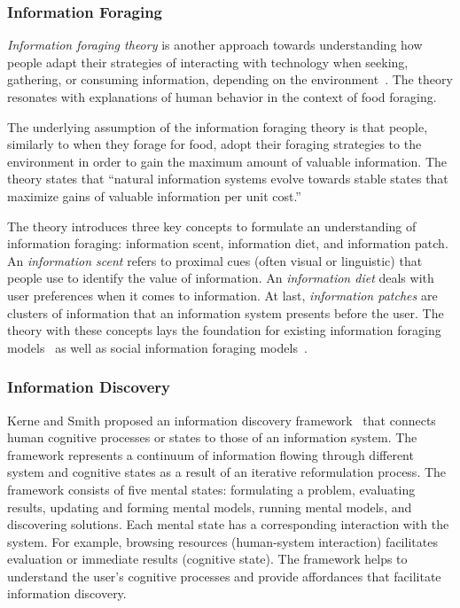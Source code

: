 \documentclass{sigchi}
\begin{document}
\subsubsection{Information Foraging}
\textit{Information foraging theory} is another approach towards understanding how people adapt their strategies of interacting with technology when seeking, gathering, or consuming information, depending on the environment~\cite{pirolli1999information}. The theory resonates with explanations of human behavior in the context of food foraging. 

The underlying assumption of the information foraging theory is that people, similarly to when they forage for food, adopt their foraging strategies to the environment in order to gain the maximum amount of valuable information. The theory states that ``natural information systems evolve towards stable states that maximize gains of valuable information per unit cost.''

The theory introduces three key concepts to formulate an understanding of information foraging: information scent, information diet, and information patch. An \textit{information scent} refers to proximal cues (often visual or linguistic) that people use to identify the value of information. An \textit{information diet} deals with user preferences when it comes to information. At last, \textit{information patches} are clusters of information that an information system presents before the user. The theory with these concepts lays the foundation for existing information foraging models~\cite{fu2007snif,kitajima2000comprehension} as well as social information foraging models~\cite{pirolli2009elementary,fu2008microstructures}.  


\subsubsection{Information Discovery}
Kerne and Smith proposed an information discovery framework~\cite{kerne2004information} that connects human cognitive processes or states to those of an information system. The framework represents a continuum of information flowing through different system and cognitive states as a result of an iterative reformulation process. The framework consists of five mental states: formulating a problem, evaluating results, updating and forming mental models, running mental models, and discovering solutions. Each mental state has a corresponding interaction with the system. For example, browsing resources (human-system interaction) facilitates evaluation or immediate results (cognitive state). The framework helps to understand the user's cognitive processes and provide affordances that facilitate information discovery.
   
\end{document}
